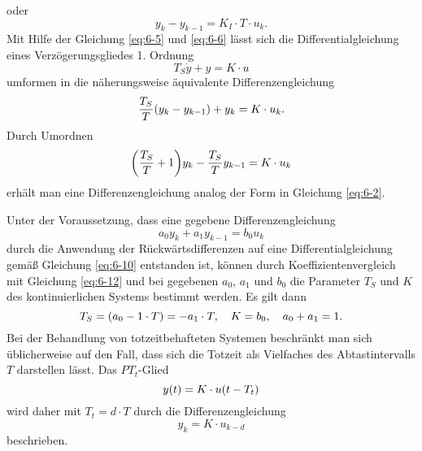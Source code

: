oder
\begin{equation}
	y_k - y_{k - 1} = K_I \cdot T \cdot u_k.
\end{equation}
Mit Hilfe der Gleichung \eqref{eq:6-5} und \eqref{eq:6-6} lässt sich die Differentialgleichung eines Verzögerungsgliedes 1. Ordnung
\begin{equation}\label{eq:6-10}
	T_S \dot{y} + y = K \cdot u
\end{equation}
umformen in die näherungsweise äquivalente Differenzengleichung
\begin{equation}
	\frac{T_S}{T}\parentheses*{y_k - y_{k - 1}} + y_k = K \cdot u_k.
\end{equation}
Durch Umordnen
\begin{equation}\label{eq:6-12}
	\parentheses*{\frac{T_S}{T} + 1}y_k - \frac{T_S}{T}y_{k - 1} = K \cdot u_k
\end{equation}
erhält man eine Differenzengleichung analog der Form in Gleichung \eqref{eq:6-2}.

Unter der Voraussetzung, dass eine gegebene Differenzengleichung
\begin{equation}
	a_0 y_k + a_1 y_{k - 1} = b_0 u_k
\end{equation}
durch die Anwendung der Rückwärtsdifferenzen auf eine Differentialgleichung gemäß Gleichung \eqref{eq:6-10} entstanden ist, können durch Koeffizientenvergleich mit Gleichung \eqref{eq:6-12} und bei gegebenen \(a_0\), \(a_1\) und \(b_0\) die Parameter \(T_S\) und \(K\) des kontinuierlichen Systems bestimmt werden.
Es gilt dann
\begin{equation}
	T_S = \parentheses*{a_0 - 1 \cdot T} = -a_1 \cdot T, \quad K = b_0, \quad a_0 + a_1 = 1.
\end{equation}
Bei der Behandlung von totzeitbehafteten Systemen beschränkt man sich üblicherweise auf den Fall, dass sich die Totzeit als Vielfaches des Abtastintervalls \(T\) darstellen lässt.
Das \(PT_t\)-Glied
\begin{equation}
	y\parentheses*{t} = K \cdot u\parentheses*{t - T_t}
\end{equation}
wird daher mit \(T_t = d \cdot T\) durch die Differenzengleichung
\begin{equation}
	y_k = K \cdot u_{k - d}
\end{equation}
beschrieben.

